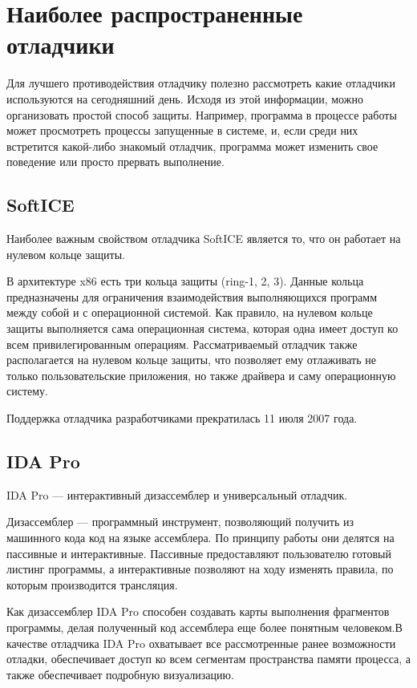 
\section{Наиболее распространенные отладчики}
Для лучшего противодействия отладчику полезно рассмотреть какие отладчики
используются на сегодняшний день. Исходя из этой информации, можно организовать
простой способ защиты. Например, программа в процессе работы может просмотреть
процессы запущенные в системе, и, если среди них встретится какой-либо знакомый
отладчик, программа может изменить свое поведение или просто прервать
выполнение.

\subsection{SoftICE}
Наиболее важным свойством отладчика SoftICE является то, что он работает на
нулевом кольце защиты.

В архитектуре x86 есть три кольца защиты (ring-1, 2, 3).
Данные кольца предназначены для ограничения взаимодействия выполняющихся
программ между собой и с операционной системой. Как правило, на нулевом кольце
защиты выполняется сама операционная система, которая одна имеет доступ ко всем
привилегированным операциям. Рассматриваемый отладчик также располагается на
нулевом кольце защиты, что позволяет ему отлаживать не только пользовательские
приложения, но также драйвера и саму операционную систему.

Поддержка отладчика разработчиками прекратилась 11 июля 2007 года.

\subsection{IDA Pro}
IDA Pro --- интерактивный дизассемблер и универсальный отладчик. 

Дизассемблер --- программный инструмент, позволяющий получить из машинного кода
код на языке ассемблера. По принципу работы они делятся на пассивные и
интерактивные. Пассивные предоставляют пользователю готовый листинг программы, а
интерактивные позволяют на ходу изменять правила, по которым производится
трансляция.

Как дизассемблер IDA Pro способен создавать карты выполнения фрагментов
программы, делая полученный код ассемблера еще более понятным человеком.В
качестве отладчика IDA Pro охватывает все рассмотренные ранее возможности
отладки, обеспечивает доступ ко всем сегментам пространства памяти процесса, а
также обеспечивает подробную визуализацию.

